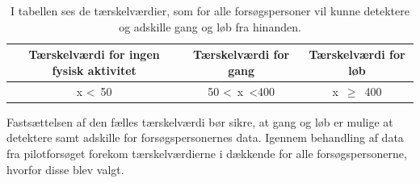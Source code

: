 \begin{table}[H]
	\centering
	\begin{tabular}{ccc}
		\hline
		\rowcolor[HTML]{C0C0C0} 
		Tærskelværdi for ingen fysisk aktivitet & Tærskelværdi for gang & Tærskelværdi for løb \\ \hline
		x \textless~50 & 50 \textless~x~\textless 400 & x~$\geq$~400 \\ \hline
	\end{tabular}
	\caption{I tabellen ses de tærskelværdier, som for alle forsøgspersoner vil kunne detektere og adskille gang og løb fra hinanden.}
	\label{tab:faelles_taerskel}
\end{table}\vspace{-0.5cm}
Fastsættelsen af den fælles tærskelværdi bør sikre, at gang og løb er mulige at detektere samt adskille for forsøgspersonernes data. Igennem behandling af data fra pilotforsøget forekom tærskelværdierne i  dækkende for alle forsøgspersonerne, hvorfor disse blev valgt.


